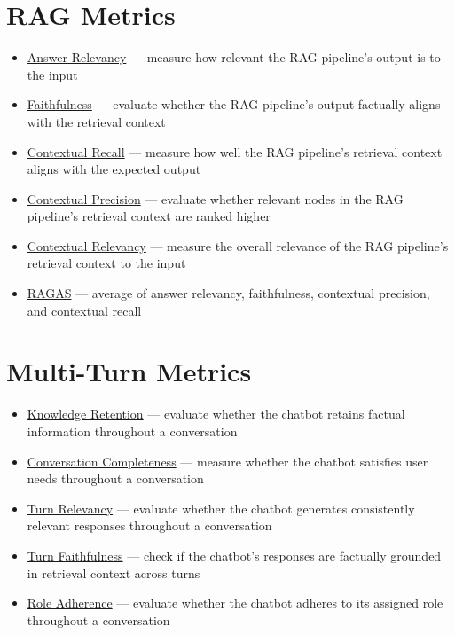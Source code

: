 \documentclass[
  letterpaper,
  DIV=11,
  numbers=noendperiod,
  oneside]{scrreprt}
\begin{document}
\begin{tcolorbox}
\section{RAG Metrics}\label{rag-metrics}

\begin{itemize}
\item
  \href{https://deepeval.com/docs/metrics-answer-relevancy}{Answer
  Relevancy} --- measure how relevant the RAG pipeline's output is to
  the input
\item
  \href{https://deepeval.com/docs/metrics-faithfulness}{Faithfulness}
  --- evaluate whether the RAG pipeline's output factually aligns with
  the retrieval context
\item
  \href{https://deepeval.com/docs/metrics-contextual-recall}{Contextual
  Recall} --- measure how well the RAG pipeline's retrieval context
  aligns with the expected output
\item
  \href{https://deepeval.com/docs/metrics-contextual-precision}{Contextual
  Precision} --- evaluate whether relevant nodes in the RAG pipeline's
  retrieval context are ranked higher
\item
  \href{https://deepeval.com/docs/metrics-contextual-relevancy}{Contextual
  Relevancy} --- measure the overall relevance of the RAG pipeline's
  retrieval context to the input
\item
  \href{https://deepeval.com/docs/metrics-ragas}{RAGAS} --- average of
  answer relevancy, faithfulness, contextual precision, and contextual
  recall
\end{itemize}

\section{Multi-Turn Metrics}\label{multi-turn-metrics}

\begin{itemize}
\item
  \href{https://deepeval.com/docs/metrics-knowledge-retention}{Knowledge
  Retention} --- evaluate whether the chatbot retains factual
  information throughout a conversation
\item
  \href{https://deepeval.com/docs/metrics-conversation-completeness}{Conversation
  Completeness} --- measure whether the chatbot satisfies user needs
  throughout a conversation
\item
  \href{https://deepeval.com/docs/metrics-turn-relevancy}{Turn
  Relevancy} --- evaluate whether the chatbot generates consistently
  relevant responses throughout a conversation
\item
  \href{https://deepeval.com/docs/metrics-turn-faithfulness}{Turn
  Faithfulness} --- check if the chatbot's responses are factually
  grounded in retrieval context across turns
\item
  \href{https://deepeval.com/docs/metrics-role-adherence}{Role
  Adherence} --- evaluate whether the chatbot adheres to its assigned
  role throughout a conversation
\end{itemize}


\end{tcolorbox}
\end{document}
